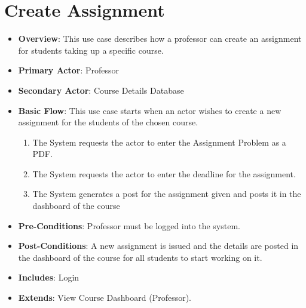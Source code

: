 \documentclass[12pt, a4]{report}
\begin{document}
\section{Create Assignment}
\begin{itemize}
    \item \textbf{Overview}: This use case describes how a professor can create an assignment for students taking up a specific course.
    \item \textbf{Primary Actor}: Professor
    \item \textbf{Secondary Actor}: Course Details Database
    \item \textbf{Basic Flow}: This use case starts when an actor wishes to create a new assignment for the students of the chosen course.
        \begin{enumerate}
            \item The System requests the actor to enter the Assignment Problem as a PDF.
            \item The System requests the actor to enter the deadline for the assignment.
            \item The System generates a post for the assignment given and posts it in the dashboard of the course
        \end{enumerate}
    \item \textbf{Pre-Conditions}: Professor must be logged into the system.
    \item \textbf{Post-Conditions}: A new assignment is issued and the details are posted in the dashboard of the course for all students to start working on it.
    \item \textbf{Includes}: Login
    \item \textbf{Extends}: View Course Dashboard (Professor).
\end{itemize}

\end{document}
